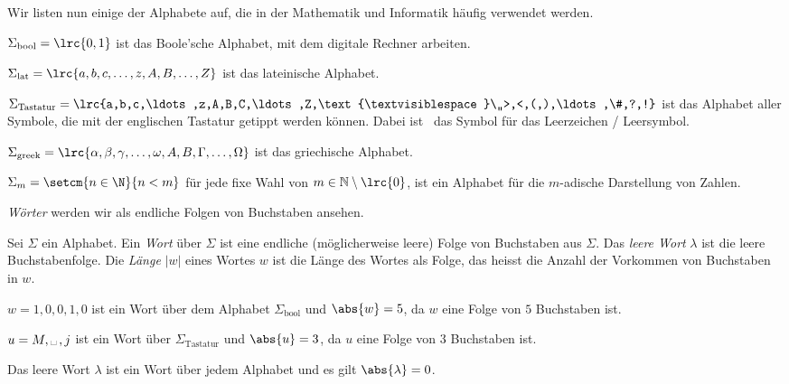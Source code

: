 Wir listen nun einige der Alphabete auf, die in der Mathematik und Informatik häufig verwendet werden.
\begin{myexample}\leavevmode
\begin{aenum}
	\item $\Sigma_{\text{bool}} = \lrc{0,1}$ ist das Boole'sche Alphabet, mit dem digitale Rechner arbeiten.
	\item $\Sigma_{\text{lat}} = \lrc{a,b,c,\ldots ,z,A,B,\ldots ,Z}$ ist das lateinische Alphabet.
	\item $\Sigma_{\text{Tastatur}} = \lrc{a,b,c,\ldots ,z,A,B,C,\ldots ,Z,\text{\textvisiblespace}\,,>,<,(,),\ldots ,\#,?,!}$ ist das Alphabet aller Symbole, die mit der englischen Tastatur getippt werden können. Dabei ist \textvisiblespace\ das Symbol für das Leerzeichen / Leersymbol.
	\item $\Sigma_{\text{greek}} = \lrc{\alpha, \beta, \gamma, \ldots , \omega, A, B, \Gamma, \ldots , \Omega}$ ist das griechische Alphabet.
	\item $\Sigma_m = \setcm{n\in\N}{n<m}$ für jede fixe Wahl von $m\in\mathbb{N}\setminus\lrc{0}$, ist ein Alphabet für die $m$-adische Darstellung von Zahlen.
\end{aenum}
\end{myexample}

\textit{Wörter} werden wir als endliche Folgen von Buchstaben ansehen.
\begin{mydefinition}[Wort]\label{mydefinition:Wort}
Sei $\Sigma$ ein Alphabet. Ein \textit{Wort} über $\Sigma$ ist eine endliche (möglicherweise leere) Folge von Buchstaben aus $\Sigma$. Das \textit{leere Wort} $\lambda$ ist die leere Buchstabenfolge.
Die \textit{Länge} $|w|$ eines Wortes $w$ ist die Länge des Wortes als Folge, das heisst die Anzahl der Vorkommen von Buchstaben in $w$.
\end{mydefinition}

\begin{myexample}
\begin{aenum}
	\item $w = 1,0,0,1,0$ ist ein Wort über dem Alphabet $\Sigma_{\text{bool}}$ und $\abs{w} = 5$, da $w$ eine Folge von $5$ Buchstaben ist.
	\item $u = M,\text{\textvisiblespace}\,, j$ ist ein Wort über $\Sigma_{\text{Tastatur}}$ und $\abs{u} = 3$, da $u$ eine Folge von $3$ Buchstaben ist.
	\item Das leere Wort $\lambda$ ist ein Wort über jedem Alphabet und es gilt $\abs{\lambda} = 0$.
\end{aenum}
\end{myexample}

